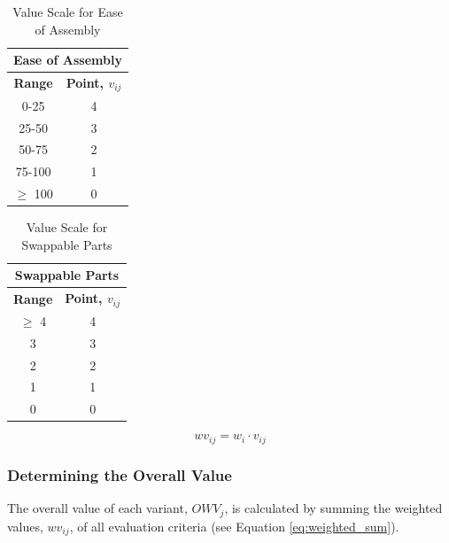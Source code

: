 \begin{table}[H]
    \centering
    \begin{tabular}{|c|c|}
        \hline
        \multicolumn{2}{|c|}{\textbf{Ease of Assembly}} \\ \hline
        \textbf{Range} & \textbf{Point, $v_{ij}$}       \\ \hline
        0-25           & 4                              \\ \hline
        25-50          & 3                              \\ \hline
        50-75          & 2                              \\ \hline
        75-100         & 1                              \\ \hline
        $\geq$ 100     & 0                              \\ \hline
    \end{tabular}
    \caption{Value Scale for Ease of Assembly}
    \label{tab:value_scale_ease_of_assembly}
\end{table}

\begin{table}[H]
    \centering
    \begin{tabular}{|c|c|}
        \hline
        \multicolumn{2}{|c|}{\textbf{Swappable Parts}} \\ \hline
        \textbf{Range} & \textbf{Point, $v_{ij}$}      \\ \hline
        $\geq$ 4       & 4                             \\ \hline
        3              & 3                             \\ \hline
        2              & 2                             \\ \hline
        1              & 1                             \\ \hline
        0              & 0                             \\ \hline
    \end{tabular}
    \caption{Value Scale for Swappable Parts}
    \label{tab:value_scale_swappable_parts}
\end{table}

\begin{equation}
    wv_{ij} = w_{i} \cdot v_{ij}
    \label{eq:weight_calculation}
\end{equation}


\subsubsection{Determining the Overall Value}
The overall value of each variant, $OWV_{j}$, is calculated by summing the weighted values, $wv_{ij}$, of all evaluation criteria (see Equation \ref{eq:weighted_sum}).

